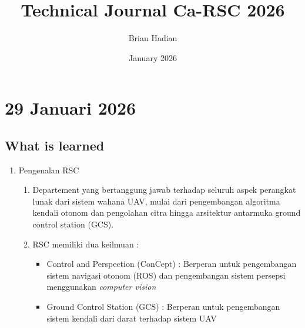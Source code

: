 \documentclass{article}
\title{Technical Journal Ca-RSC 2026}
\author{Brian Hadian}
\date{January 2026}
\begin{document}
\maketitle

\section{29 Januari 2026}

\subsection{What is learned}
    \begin{enumerate}
        \item Pengenalan RSC
        \begin{enumerate}
            \item Departement yang bertanggung jawab terhadap seluruh aspek perangkat lunak dari sistem wahana UAV, mulai dari pengembangan algoritma kendali otonom dan pengolahan citra hingga arsitektur antarmuka ground control station (GCS).
            \item RSC memiliki dua keilmuan : 
            \begin{itemize}
                \item Control and Perspection (ConCept) : Berperan untuk pengembangan sistem navigasi otonom (ROS) dan pengembangan sistem persepsi menggunakan \textit{computer vision}
                \item Ground Control Station (GCS) :  Berperan untuk pengembangan sistem kendali dari darat terhadap sistem UAV
            \end{itemize}
        \end{enumerate}
        

\end{enumerate}
\end{document}
